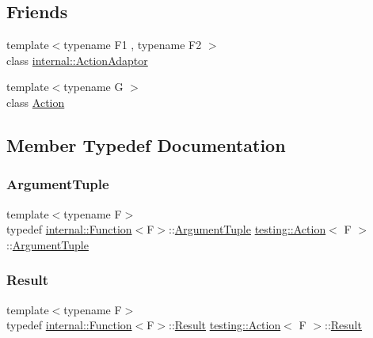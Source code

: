 \subsection*{Friends}
\begin{DoxyCompactItemize}
\item 
{\footnotesize template$<$typename F1 , typename F2 $>$ }\\class \mbox{\hyperlink{classtesting_1_1Action_a66fe4f9c9b9d020273151aa6054b491e}{internal\+::\+Action\+Adaptor}}
\item 
{\footnotesize template$<$typename G $>$ }\\class \mbox{\hyperlink{classtesting_1_1Action_a62bc48ff11968b6e45d21c4b49f349fb}{Action}}
\end{DoxyCompactItemize}


\subsection{Member Typedef Documentation}
\mbox{\label{classtesting_1_1Action_ae27fda510696a9294f991de5b1abfaf2}} 
\subsubsection{\texorpdfstring{ArgumentTuple}{ArgumentTuple}}
{\footnotesize\ttfamily template$<$typename F$>$ \\
typedef \mbox{\hyperlink{structtesting_1_1internal_1_1Function}{internal\+::\+Function}}$<$F$>$\+::\mbox{\hyperlink{classtesting_1_1Action_ae27fda510696a9294f991de5b1abfaf2}{Argument\+Tuple}} \mbox{\hyperlink{classtesting_1_1Action}{testing\+::\+Action}}$<$ F $>$\+::\mbox{\hyperlink{classtesting_1_1Action_ae27fda510696a9294f991de5b1abfaf2}{Argument\+Tuple}}}

\mbox{\label{classtesting_1_1Action_a9af08a21ad329331fde856cba9b6dea2}} 
\subsubsection{\texorpdfstring{Result}{Result}}
{\footnotesize\ttfamily template$<$typename F$>$ \\
typedef \mbox{\hyperlink{structtesting_1_1internal_1_1Function}{internal\+::\+Function}}$<$F$>$\+::\mbox{\hyperlink{classtesting_1_1Action_a9af08a21ad329331fde856cba9b6dea2}{Result}} \mbox{\hyperlink{classtesting_1_1Action}{testing\+::\+Action}}$<$ F $>$\+::\mbox{\hyperlink{classtesting_1_1Action_a9af08a21ad329331fde856cba9b6dea2}{Result}}}



